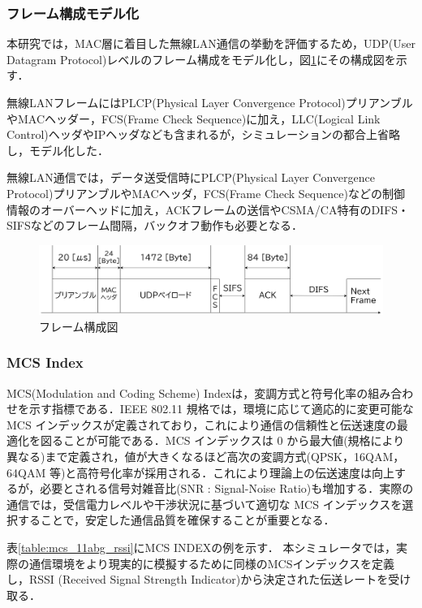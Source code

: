 \documentclass[a4paper,10pt]{ltjsarticle}
\begin{document}
\subsubsection{フレーム構成モデル化}

本研究では，MAC層に着目した無線LAN通信の挙動を評価するため，UDP(User Datagram Protocol)レベルのフレーム構成をモデル化し，図\ref{packet}にその構成図を示す．

無線LANフレームにはPLCP(Physical Layer Convergence Protocol)プリアンブルやMACヘッダー，FCS(Frame Check Sequence)に加え，LLC(Logical Link Control)ヘッダやIPヘッダなども含まれるが，シミュレーションの都合上省略し，モデル化した．

無線LAN通信では，データ送受信時にPLCP(Physical Layer Convergence Protocol)プリアンブルやMACヘッダ，FCS(Frame Check Sequence)などの制御情報のオーバーヘッドに加え，ACKフレームの送信やCSMA/CA特有のDIFS・SIFSなどのフレーム間隔，バックオフ動作も必要となる．

\begin{figure}[H]
  \centering
  \includegraphics[width=1\columnwidth]{./assets/packet.png}
  \caption{フレーム構成図}
  \label{packet}
\end{figure}


\clearpage
\subsubsection{MCS Index}
MCS(Modulation and Coding Scheme) Indexは，変調方式と符号化率の組み合わせを示す指標である．IEEE 802.11 規格では，環境に応じて適応的に変更可能な MCS インデックスが定義されており，これにより通信の信頼性と伝送速度の最適化を図ることが可能である．MCS インデックスは 0 から最大値(規格により異なる)まで定義され，値が大きくなるほど高次の変調方式(QPSK，16QAM，64QAM 等)と高符号化率が採用される．これにより理論上の伝送速度は向上するが，必要とされる信号対雑音比(SNR : Signal-Noise Ratio)も増加する．実際の通信では，受信電力レベルや干渉状況に基づいて適切な MCS インデックスを選択することで，安定した通信品質を確保することが重要となる．

表\ref{table:mcs_11abg_rssi}にMCS INDEXの例を示す．
本シミュレータでは，実際の通信環境をより現実的に模擬するために同様のMCSインデックスを定義し，RSSI (Received Signal Strength Indicator)から決定された伝送レートを受け取る．\\
\end{document}

